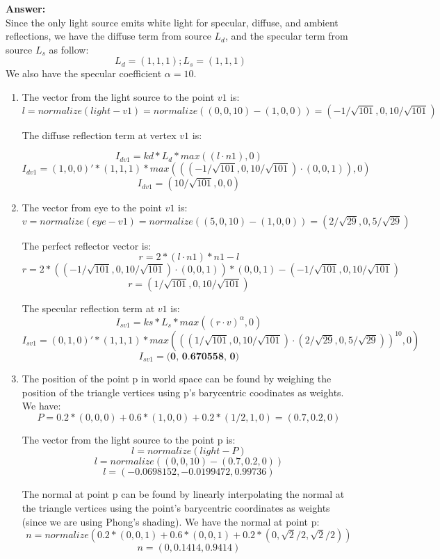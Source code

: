 \documentclass[12pt]{letter}
\begin{document}
\begin{enumerate}
	\textbf{Answer:} \\
	Since the only light source emits white light for specular, diffuse, and ambient reflections, we have the diffuse term from source $L_d$, and the specular term from source $L_s$ as follow:
	$$ L_d = (1, 1, 1); L_s = (1, 1, 1) $$
	We also have the specular coefficient $\alpha = 10$.
	\begin{enumerate}
		\item
		The vector from the light source to the point $v1$ is:
		$$ l = normalize(light - v1) = normalize((0, 0, 10) - (1, 0, 0)) = (-1/\sqrt{101}, 0, 10/\sqrt{101})$$
		
		The diffuse reflection term at vertex $v1$ is:
		
		$$ I_{dv1} = kd*L_d*max((l \cdot n1), 0)$$
		$$ I_{dv1} = (1, 0, 0)' * (1, 1, 1) * max(((-1/\sqrt{101}, 0, 10/\sqrt{101}) \cdot (0, 0, 1)), 0) $$
		$$ I_{dv1} = (10/\sqrt{101}, 0, 0) $$
		
		\item
		The vector from eye to the point $v1$ is:
		$$ v = normalize(eye - v1) = normalize((5, 0, 10) - (1, 0, 0)) = (2/\sqrt{29}, 0, 5/\sqrt{29}) $$
		
		The perfect reflector vector is:
		$$ r = 2*(l \cdot n1)*n1 - l $$
		$$ r = 2*((-1/\sqrt{101}, 0, 10/\sqrt{101}) \cdot (0, 0, 1))*(0, 0, 1) - (-1/\sqrt{101}, 0, 10/\sqrt{101}) $$
		$$ r = (1/\sqrt{101}, 0, 10/\sqrt{101}) $$
		
		The specular reflection term at $v1$ is:
		$$ I_{sv1} = ks * L_s * max((r \cdot v)^\alpha, 0) $$
		$$ I_{sv1} = (0, 1, 0)' * (1, 1, 1) * max(((1/\sqrt{101}, 0, 10/\sqrt{101}) \cdot (2/\sqrt{29}, 0, 5/\sqrt{29}))^{10}, 0) $$
		$$ I_{sv1} = \textbf{(0, 0.670558, 0)} $$
		
		\item
		The position of the point p in world space can be found by weighing the position of the triangle vertices using p's barycentric coodinates as weights.
		We have:
		$$P = 0.2*(0, 0, 0) + 0.6*(1, 0, 0) + 0.2*(1/2, 1, 0) = (0.7, 0.2, 0)$$
			
		The vector from the light source to the point p is:
		$$ l = normalize(light - P) $$
		$$ l = normalize((0, 0, 10) - (0.7, 0.2, 0)) $$
		$$ l= (-0.0698152, -0.0199472, 0.99736) $$
	
		The normal at point p can be found by linearly interpolating the normal at the triangle vertices using the point's barycentric coordinates as weights (since we are using Phong's shading).
		We have the normal at point p:
		$$ n = normalize(0.2*(0, 0, 1) + 0.6*(0, 0, 1) + 0.2*(0, \sqrt{2}/2, \sqrt{2}/2)) $$
		$$ n = (0, 0.1414, 0.9414) $$
		

\end{enumerate}
\end{enumerate}
\end{document}
